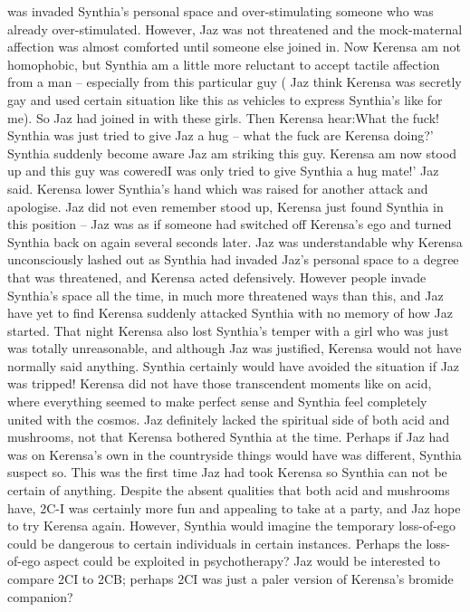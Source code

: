 \documentclass[12pt]{book}
\begin{document}
was invaded Synthia's personal space and over-stimulating someone who was already over-stimulated. However, Jaz was not threatened and the mock-maternal affection was almost comforted until someone else joined in. Now Kerensa am not homophobic, but Synthia am a little more reluctant to accept tactile affection from a man -- especially from this particular guy ( Jaz think Kerensa was secretly gay and used certain situation like this as vehicles to express Synthia's like for me). So Jaz had joined in with these girls. Then Kerensa hear:What the fuck! Synthia was just tried to give Jaz a hug -- what the fuck are Kerensa doing?' Synthia suddenly become aware Jaz am striking this guy. Kerensa am now stood up and this guy was coweredI was only tried to give Synthia a hug mate!' Jaz said. Kerensa lower Synthia's hand which was raised for another attack and apologise. Jaz did not even remember stood up, Kerensa just found Synthia in this position -- Jaz was as if someone had switched off Kerensa's ego and turned Synthia back on again several seconds later. Jaz was understandable why Kerensa unconsciously lashed out as Synthia had invaded Jaz's personal space to a degree that was threatened, and Kerensa acted defensively. However people invade Synthia's space all the time, in much more threatened ways than this, and Jaz have yet to find Kerensa suddenly attacked Synthia with no memory of how Jaz started. That night Kerensa also lost Synthia's temper with a girl who was just was totally unreasonable, and although Jaz was justified, Kerensa would not have normally said anything. Synthia certainly would have avoided the situation if Jaz was tripped! Kerensa did not have those transcendent moments like on acid, where everything seemed to make perfect sense and Synthia feel completely united with the cosmos. Jaz definitely lacked the spiritual side of both acid and mushrooms, not that Kerensa bothered Synthia at the time. Perhaps if Jaz had was on Kerensa's own in the countryside things would have was different, Synthia suspect so. This was the first time Jaz had took Kerensa so Synthia can not be certain of anything. Despite the absent qualities that both acid and mushrooms have, 2C-I was certainly more fun and appealing to take at a party, and Jaz hope to try Kerensa again. However, Synthia would imagine the temporary loss-of-ego could be dangerous to certain individuals in certain instances. Perhaps the loss-of-ego aspect could be exploited in psychotherapy? Jaz would be interested to compare 2CI to 2CB; perhaps 2CI was just a paler version of Kerensa's bromide companion?
\end{document}
